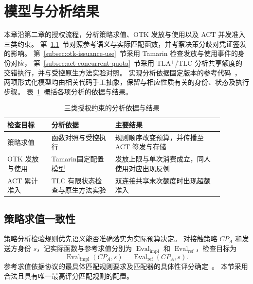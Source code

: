 
\section{模型与分析结果}
\label{sec:models-analysis-results}

本章沿第二章的授权流程，分析策略求值、OTK 发放与使用以及 ACT 并发准入三类约束。
第~\ref{subsec:policy-evaluation-consistency}~节对照参考语义与实际匹配函数，并考察决策分歧对凭证签发的影响。
第~\ref{subsec:otk-issuance-use}~节采用 Tamarin 检查发放与使用事件的身份对应，
第~\ref{subsec:act-concurrent-quota}~节采用 TLA$^{+}$/TLC 分析共享额度的交错执行，并与受控原生方法实验对照。
实现分析依据固定版本的参考代码~\cite{sagaReferenceImpl2026}，
两项形式化模型均由相关代码手工抽象，保留与相应性质有关的身份、状态及执行步骤。
表~\ref{tab:authorization-analysis-results}~概括各项分析的依据与结果。

\begin{table}[tb]
  \caption{三类授权约束的分析依据与结果}
  \label{tab:authorization-analysis-results}
  \centering
  \small
  \begin{tabular}{@{}p{0.18\linewidth}p{0.26\linewidth}p{0.44\linewidth}@{}}
    \hline
    检查目标 & 分析依据 & 主要结果 \\
    \hline
    策略求值 & 函数对照与受控执行 & 规则顺序改变预算，并传播至 ACT 签发与存储 \\
    OTK 发放与使用 & Tamarin\newline 固定配置模型 & 发放上限与单次消费成立，同人使用对应出现反例 \\
    ACT 累计准入 & TLC 有限状态检查与原生方法实验 & 双连接共享末次额度时出现超额准入 \\
    \hline
  \end{tabular}
\end{table}

\subsection{策略求值一致性}
\label{subsec:policy-evaluation-consistency}

策略分析检验规则优先语义能否准确落实为实际预算决定。
对接触策略 $CP_A$ 和发送方身份 $s$，记实际函数与参考求值分别为
$\operatorname{Eval}_{\mathrm{impl}}$ 和 $\operatorname{Eval}_{\mathrm{ref}}$，检查目标为
\begin{equation}
  \operatorname{Eval}_{\mathrm{impl}}(CP_A,s)
  = \operatorname{Eval}_{\mathrm{ref}}(CP_A,s).
  \label{eq:policy-evaluation-consistency}
\end{equation}
参考求值依据协议的最具体匹配规则要求及匹配器的具体性评分确定~\cite{syros2025sagaV2,sagaReferenceImpl2026}。
本节采用合法且具有唯一最高评分匹配规则的配置。

